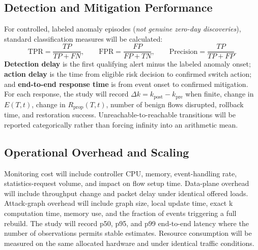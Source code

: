 \documentclass[12pt,a4paper,oneside]{article}
\begin{document}
\subsection{Detection and Mitigation Performance}
For controlled, labeled anomaly episodes (\emph{not genuine zero-day discoveries}), standard classification measures will be calculated:
\begin{equation}
\mathrm{TPR}=\frac{TP}{TP+FN},\qquad
\mathrm{FPR}=\frac{FP}{FP+TN},\qquad
\mathrm{Precision}=\frac{TP}{TP+FP}.\label{eq:detection}
\end{equation}
\textbf{Detection delay} is the first qualifying alert minus the labeled anomaly onset; \textbf{action delay} is the time from eligible risk decision to confirmed switch action; and \textbf{end-to-end response time} is from event onset to confirmed mitigation. For each response, the study will record $\Delta k=k_{\mathrm{post}}-k_{\mathrm{pre}}$ when finite, change in $E(T,t)$, change in $R_{\mathrm{prop}}(T,t)$, number of benign flows disrupted, rollback time, and restoration success. Unreachable-to-reachable transitions will be reported categorically rather than forcing infinity into an arithmetic mean.

\subsection{Operational Overhead and Scaling}
Monitoring cost will include controller CPU, memory, event-handling rate, statistics-request volume, and impact on flow setup time. Data-plane overhead will include throughput change and packet delay under identical offered loads. Attack-graph overhead will include graph size, local update time, exact k computation time, memory use, and the fraction of events triggering a full rebuild. The study will record p50, p95, and p99 end-to-end latency where the number of observations permits stable estimates. Resource consumption will be measured on the same allocated hardware and under identical traffic conditions.
\end{document}
